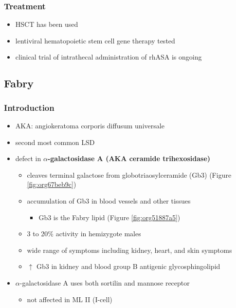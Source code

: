 \documentclass[12pt]{scrartcl}
\begin{document}
\subsubsection{Treatment}
\label{sec:orgbaa3a59}
\begin{itemize}
\item HSCT has been used
\item lentiviral hematopoietic stem cell gene therapy tested
\item clinical trial of intrathecal administration of rhASA is ongoing
\end{itemize}
\subsection{Fabry}
\label{sec:org1b03fc8}
\subsubsection{Introduction}
\label{sec:orgb396201}
\begin{itemize}
\item AKA: angiokeratoma corporis diffusum universale
\item second most common LSD
\item defect in \textbf{\(\alpha\)-galactosidase A (AKA ceramide trihexosidase)}
\begin{itemize}
\item cleaves terminal galactose from globotriaosylceramide (Gb3)
(Figure \ref{fig:org67beb9c})
\item accumulation of Gb3 in blood vessels and other tissues
\begin{itemize}
\item Gb3 is the Fabry lipid (Figure \ref{fig:org51887a5})
\end{itemize}
\item 3 to 20\% activity in hemizygote males
\item wide range of symptoms including kidney, heart, and skin symptoms
\item \(\uparrow\) Gb3 in kidney and blood group B antigenic glycosphingolipid
\end{itemize}
\item \(\alpha\)-galactosidase A uses both sortilin and mannose receptor
\begin{itemize}
\item not affected in ML II (I-cell)
\end{itemize}
\end{itemize}
\end{document}
